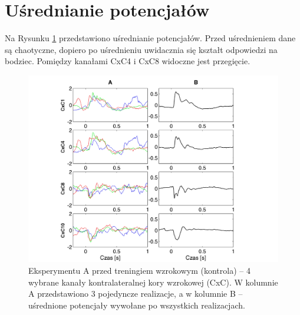 \documentclass{pracamgr_2}
\begin{document}
\section{Uśrednianie potencjałów}
Na Rysunku \ref{rys:usrednione_CxC} przedstawiono uśrednianie potencjałów. Przed uśrednieniem dane są chaotyczne, dopiero po uśrednieniu uwidacznia się kształt odpowiedzi na bodziec. Pomiędzy kanałami CxC4 i CxC8 widoczne jest przegięcie.
\begin{figure}[htbp]
	\begin{center}
		\includegraphics[scale=0.7]{usrednione_CxC.png}
	\end{center}
	\caption{Eksperymentu A przed treningiem wzrokowym (kontrola) -- 4 wybrane kanały kontralateralnej kory wzrokowej (CxC). W kolumnie A przedstawiono 3 pojedyncze realizacje, a w kolumnie B --  uśrednione potencjały wywołane po wszystkich realizacjach.}
	\label{rys:usrednione_CxC}
\end{figure}
\end{document}
